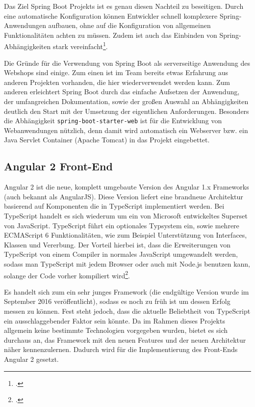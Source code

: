 Das Ziel Spring Boot Projekts ist es genau diesen Nachteil zu beseitigen. Durch eine automatische Konfiguration können Entwickler schnell komplexere Spring-Anwendungen aufbauen, ohne auf die Konfiguration von allgemeinen Funktionalitäten achten zu müssen. Zudem ist auch das Einbinden von Spring-Abhängigkeiten stark vereinfacht\footcite[Vgl.][]{Webb2013}.

Die Gründe für die Verwendung von Spring Boot als serverseitige Anwendung des Webshops sind einige. Zum einen ist im Team bereits etwas Erfahrung aus anderen Projekten vorhanden, die hier wiederverwendet werden kann. Zum anderen erleichtert Spring Boot durch das einfache Aufsetzen der Anwendung, der umfangreichen Dokumentation, sowie der großen Auswahl an Abhängigkeiten deutlich den Start mit der Umsetzung der eigentlichen Anforderungen. Besonders die Abhängigkeit \texttt{spring-boot-starter-web} ist für die Entwicklung von Webanwendungen nützlich, denn damit wird automatisch ein Webserver bzw. ein Java Servlet Container (Apache Tomcat) in das Projekt eingebettet.

\subsection{Angular 2 Front-End}\label{angular_arch}

Angular 2 ist die neue, komplett umgebaute Version des Angular 1.x Frameworks (auch bekannt als AngularJS). Diese Version liefert eine brandneue Architektur basierend auf Komponenten die in TypeScript implementiert werden. Bei TypeScript handelt es sich wiederum um ein von Microsoft entwickeltes Superset von JavaScript. TypeScript führt ein optionales Typsystem ein, sowie mehrere ECMAScript 6 Funktionalitäten, wie zum Beispiel Unterstützung von Interfaces, Klassen und Vererbung. Der Vorteil hierbei ist, dass die Erweiterungen von TypeScript von einem Compiler in normales JavaScript umgewandelt werden, sodass man TypeScript mit jedem Browser oder auch mit Node.js benutzen kann, solange der Code vorher kompiliert wird\footcite[Vgl.][S. 33]{Deeleman2016}. 

Es handelt sich zum ein sehr junges Framework (die endgültige Version wurde im September 2016 veröffentlicht), sodass es noch zu früh ist um dessen Erfolg messen zu können. Fest steht jedoch, dass die aktuelle Beliebtheit von TypeScript ein ausschlaggebender Faktor sein könnte. Da im Rahmen dieses Projekts allgemein keine bestimmte Technologien vorgegeben wurden, bietet es sich durchaus an, das Framework mit den neuen Features und der neuen Architektur näher kennenzulernen. Dadurch wird für die Implementierung des Front-Ends Angular 2 gesetzt.


